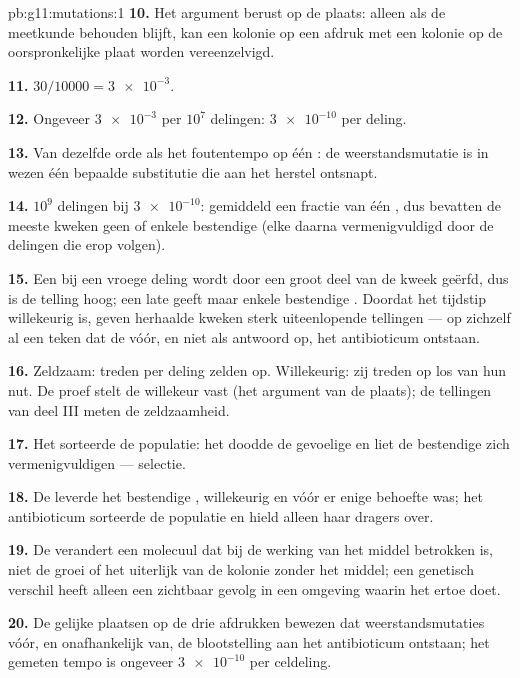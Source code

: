 \begin{solution}{pb:g11:mutations:1}
\textbf{10.} Het argument berust op de plaats: alleen als de meetkunde
behouden blijft, kan een kolonie op een afdruk met een kolonie op de
oorspronkelijke plaat worden vereenzelvigd.

\textbf{11.} $30/\num{10000} = \num{3e-3}$.

\textbf{12.} Ongeveer $\num{3e-3}$  per $10^7$ delingen:
$\num{3e-10}$ per deling.

\textbf{13.} Van dezelfde orde als het foutentempo op één : de
weerstandsmutatie is in wezen één bepaalde substitutie die aan het
herstel ontsnapt.

\textbf{14.} $10^9$ delingen bij $\num{3e-10}$: gemiddeld een fractie van
één , dus bevatten de meeste kweken geen of enkele bestendige
 (elke  daarna vermenigvuldigd door de delingen die erop
volgen).

\textbf{15.} Een  bij een vroege deling wordt door een groot deel
van de kweek geërfd, dus is de telling hoog; een late geeft maar enkele
bestendige . Doordat het tijdstip willekeurig is, geven herhaalde
kweken sterk uiteenlopende tellingen --- op zichzelf al een teken dat de
 vóór, en niet als antwoord op, het antibioticum ontstaan.

\textbf{16.} Zeldzaam:  treden per deling zelden op.
Willekeurig: zij treden op los van hun nut. De proef stelt de willekeur
vast (het argument van de plaats); de tellingen van deel III meten de
zeldzaamheid.

\textbf{17.} Het sorteerde de populatie: het doodde de gevoelige 
en liet de bestendige zich vermenigvuldigen --- selectie.

\textbf{18.} De  leverde het bestendige , willekeurig en
vóór er enige behoefte was; het antibioticum sorteerde de populatie en
hield alleen haar dragers over.

\textbf{19.} De  verandert een molecuul dat bij de werking van het
middel betrokken is, niet de groei of het uiterlijk van de kolonie zonder
het middel; een genetisch verschil heeft alleen een zichtbaar gevolg in
een omgeving waarin het ertoe doet.

\textbf{20.} De gelijke plaatsen op de drie afdrukken bewezen dat
weerstandsmutaties vóór, en onafhankelijk van, de blootstelling aan het
antibioticum ontstaan; het gemeten tempo is ongeveer $\num{3e-10}$ per
celdeling.
\end{solution}
